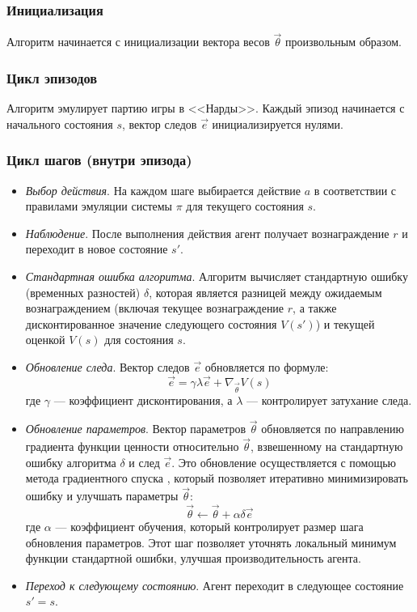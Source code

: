 
\subsubsection{Инициализация}
Алгоритм начинается с инициализации вектора весов $\vec{\theta}$ произвольным образом.

\subsubsection{Цикл эпизодов}
Алгоритм эмулирует партию игры в <<Нарды>>. Каждый эпизод начинается с начального состояния $s$, вектор следов $\vec{e}$ инициализируется нулями.

\subsubsection{Цикл шагов (внутри эпизода)}
\begin{itemize}
    \item \textit{Выбор действия}. На каждом шаге выбирается действие $a$ в соответствии с правилами эмуляции системы $\pi$ для текущего состояния $s$.
    \item \textit{Наблюдение}. После выполнения действия агент получает вознаграждение $r$ и переходит в новое состояние $s'$.
    \item \textit{Стандартная ошибка алгоритма}. Алгоритм вычисляет стандартную ошибку (временных разностей) $\delta$, которая является разницей между ожидаемым вознаграждением (включая текущее вознаграждение $r$, а также дисконтированное значение следующего состояния $V(s')$) и текущей оценкой $V(s)$ для состояния $s$.
    \item \textit{Обновление следа}. Вектор следов $\vec{e}$ обновляется по формуле:
    \begin{equation}
        \vec{e} = \gamma \lambda \vec{e} + \nabla_{\vec{\theta}} V(s)
    \end{equation}
    где $\gamma$ --- коэффициент дисконтирования, а $\lambda$ --- контролирует затухание следа.
    \item \textit{Обновление параметров}. Вектор параметров $\vec{\theta}$ обновляется по направлению градиента функции ценности относительно $\vec{\theta}$, взвешенному на стандартную ошибку алгоритма $\delta$ и след $\vec{e}$. Это обновление осуществляется с помощью метода градиентного спуска \cite{gradient-descent}, который позволяет итеративно минимизировать ошибку и улучшать параметры $\vec{\theta}$:
    \begin{equation}
        \vec{\theta} \gets \vec{\theta} + \alpha \delta \vec{e}
    \end{equation}
    где $\alpha$ — коэффициент обучения, который контролирует размер шага обновления параметров. Этот шаг позволяет уточнять локальный минимум функции стандартной ошибки, улучшая производительность агента.
    \item \textit{Переход к следующему состоянию}. Агент переходит в следующее состояние $s' = s$.
    \end{itemize}

